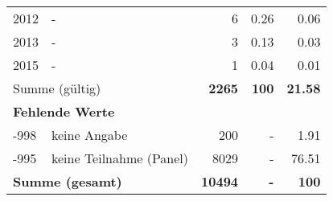 \begin{longtable}{lXrrr}
     2012 &
     \multicolumn{1}{X}{ -  } &


       \num{6} &
       \num[round-mode=places,round-precision=2]{0,26} &
         \num[round-mode=places,round-precision=2]{0,06} \\

     2013 &
     \multicolumn{1}{X}{ -  } &


       \num{3} &
       \num[round-mode=places,round-precision=2]{0,13} &
         \num[round-mode=places,round-precision=2]{0,03} \\

     2015 &
     \multicolumn{1}{X}{ -  } &


       \num{1} &
       \num[round-mode=places,round-precision=2]{0,04} &
         \num[round-mode=places,round-precision=2]{0,01} \\
     \midrule
     \multicolumn{2}{l}{Summe (gültig)} &
       \textbf{\num{2265}} &
     \textbf{100} &
       \textbf{\num[round-mode=places,round-precision=2]{21,58}} \\
     \multicolumn{5}{l}{\textbf{Fehlende Werte}}\\
       -998 &
       keine Angabe &
         \num{200} &
        - &
         \num[round-mode=places,round-precision=2]{1,91} \\
       -995 &
       keine Teilnahme (Panel) &
         \num{8029} &
        - &
         \num[round-mode=places,round-precision=2]{76,51} \\
     \midrule
     \multicolumn{2}{l}{\textbf{Summe (gesamt)}} &
          \textbf{\num{10494}} &
        \textbf{-} &
        \textbf{100} \\
     \bottomrule
     \end{longtable}
     
